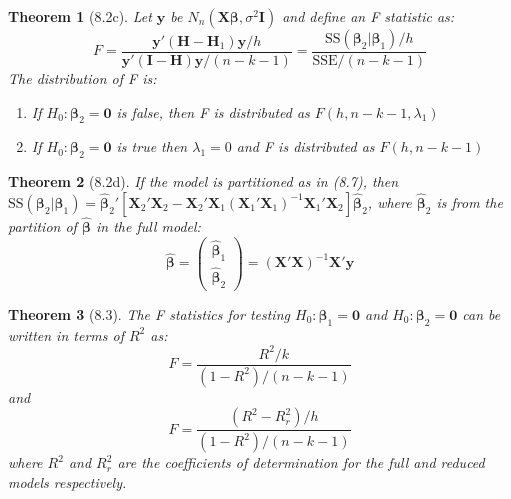 \documentclass{article}
\newtheorem{theorem}{Theorem}[section]
\begin{document}
\begin{theorem}[8.2c]
Let $\mathbf{y}$ be $N_n(\mathbf{X}\boldsymbol{\beta}, \sigma^2\mathbf{I})$ and define an F statistic as:
\[F = \frac{\mathbf{y}'(\mathbf{H}-\mathbf{H}_1)\mathbf{y}/h}{\mathbf{y}'(\mathbf{I}-\mathbf{H})\mathbf{y}/(n-k-1)} = \frac{\text{SS}(\boldsymbol{\beta}_2|\boldsymbol{\beta}_1)/h}{\text{SSE}/(n-k-1)}\]
The distribution of F is:
\begin{enumerate}[label=(\roman*)]
\item If $H_0:\boldsymbol{\beta}_2 = \mathbf{0}$ is false, then F is distributed as $F(h,n-k-1,\lambda_1)$
\item If $H_0:\boldsymbol{\beta}_2 = \mathbf{0}$ is true then $\lambda_1 = 0$ and F is distributed as $F(h,n-k-1)$
\end{enumerate}
\end{theorem}

\begin{theorem}[8.2d]
If the model is partitioned as in (8.7), then $\text{SS}(\boldsymbol{\beta}_2|\boldsymbol{\beta}_1) = \hat{\boldsymbol{\beta}}_2'[\mathbf{X}_2'\mathbf{X}_2 - \mathbf{X}_2'\mathbf{X}_1(\mathbf{X}_1'\mathbf{X}_1)^{-1}\mathbf{X}_1'\mathbf{X}_2]\hat{\boldsymbol{\beta}}_2$, where $\hat{\boldsymbol{\beta}}_2$ is from the partition of $\hat{\boldsymbol{\beta}}$ in the full model:
\[\hat{\boldsymbol{\beta}} = \begin{pmatrix} \hat{\boldsymbol{\beta}}_1 \\ \hat{\boldsymbol{\beta}}_2\end{pmatrix} = (\mathbf{X}'\mathbf{X})^{-1}\mathbf{X}'\mathbf{y}\]
\end{theorem}

\begin{theorem}[8.3]
The F statistics for testing $H_0: \boldsymbol{\beta}_1 = \mathbf{0}$ and $H_0: \boldsymbol{\beta}_2 = \mathbf{0}$ can be written in terms of $R^2$ as:
\[F = \frac{R^2/k}{(1-R^2)/(n-k-1)}\]
and
\[F = \frac{(R^2 - R_r^2)/h}{(1-R^2)/(n-k-1)}\]
where $R^2$ and $R_r^2$ are the coefficients of determination for the full and reduced models respectively.
\end{theorem}
\end{document}
